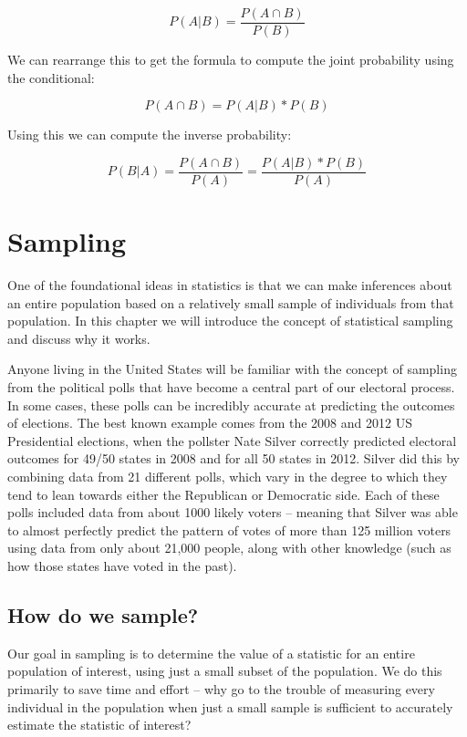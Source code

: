 \documentclass[12pt,]{book}
\theoremstyle{definition}
\theoremstyle{definition}
\theoremstyle{definition}
\theoremstyle{remark}
\begin{document}
\[
P(A|B) = \frac{P(A \cap B)}{P(B)}
\]

We can rearrange this to get the formula to compute the joint probability using the conditional:

\[
P(A \cap B) = P(A|B) * P(B)
\]

Using this we can compute the inverse probability:

\[
P(B|A) = \frac{P(A \cap B)}{P(A)} =   \frac{P(A|B)*P(B)}{P(A)}
\]

\hypertarget{sampling}{%
\chapter{Sampling}\label{sampling}}

One of the foundational ideas in statistics is that we can make inferences about an entire population based on a relatively small sample of individuals from that population. In this chapter we will introduce the concept of statistical sampling and discuss why it works.

Anyone living in the United States will be familiar with the concept of sampling from the political polls that have become a central part of our electoral process. In some cases, these polls can be incredibly accurate at predicting the outcomes of elections. The best known example comes from the 2008 and 2012 US Presidential elections, when the pollster Nate Silver correctly predicted electoral outcomes for 49/50 states in 2008 and for all 50 states in 2012. Silver did this by combining data from 21 different polls, which vary in the degree to which they tend to lean towards either the Republican or Democratic side. Each of these polls included data from about 1000 likely voters -- meaning that Silver was able to almost perfectly predict the pattern of votes of more than 125 million voters using data from only about 21,000 people, along with other knowledge (such as how those states have voted in the past).

\hypertarget{how-do-we-sample}{%
\section{How do we sample?}\label{how-do-we-sample}}

Our goal in sampling is to determine the value of a statistic for an entire population of interest, using just a small subset of the population. We do this primarily to save time and effort -- why go to the trouble of measuring every individual in the population when just a small sample is sufficient to accurately estimate the statistic of interest?
\end{document}
